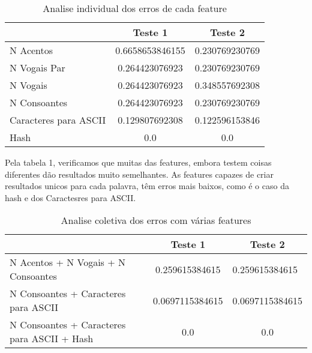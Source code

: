 \documentclass{scrartcl}
\begin{document}
\begin{table}[htbp]
    \centering
    \caption{Analise individual dos erros de cada feature}
    \label{my-label}
    \begin{tabular}{|l|c|c|}
    \hline
    \multicolumn{1}{|r|}{}                                      & \textbf{Teste 1} & \textbf{Teste 2}                    \\ \hline
    N Acentos & 0.6658653846155   & 0.230769230769 \\ \hline
    N Vogais Par & 0.264423076923   & 0.230769230769 \\ \hline
    N Vogais & 0.264423076923   & 0.348557692308 \\ \hline
    N Consoantes   & 0.264423076923  & 0.230769230769      \\ \hline
    Caracteres para ASCII                             & 0.129807692308              & 0.122596153846                                 \\ \hline
    Hash                             & 0.0              & 0.0                                 \\ \hline
    \end{tabular}
    \end{table}
\par

Pela tabela 1, verificamos que muitas das features, embora testem coisas diferentes dão resultados muito semelhantes. As features capazes de criar resultados unicos para cada palavra, têm erros mais baixos, como é o caso da hash e dos Caractesres para ASCII.

\begin{table}[htbp]
    \centering
    \caption{Analise coletiva dos erros com várias features}
    \label{my-label}
    \begin{tabular}{|l|c|c|}
    \hline
    \multicolumn{1}{|r|}{}                                      & \textbf{Teste 1} & \textbf{Teste 2}                    \\ \hline
    N Acentos + N Vogais + N Consoantes & 0.259615384615   & \multicolumn{1}{l|}{0.259615384615} \\ \hline
    N Consoantes + Caracteres para ASCII                & 0.0697115384615  & 0.0697115384615                     \\ \hline
    N Consoantes + Caracteres para ASCII + Hash                             & 0.0              & 0.0                                 \\ \hline
    \end{tabular}
    \end{table}
\par
\end{document}
